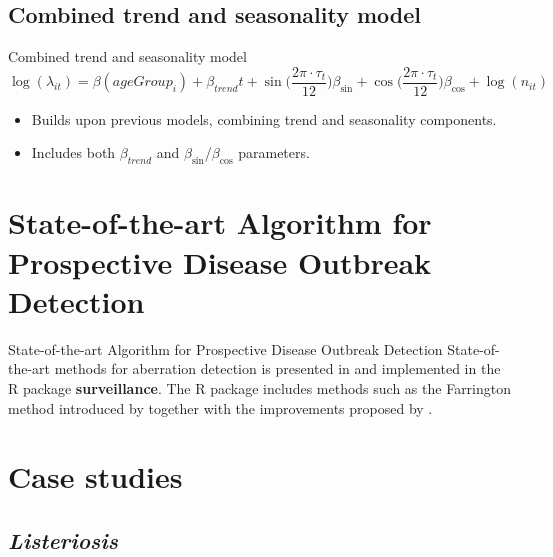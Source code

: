 \documentclass[aspectratio=169]{beamer}
\begin{document}
\hypertarget{combined-trend-and-seasonality-model}{%
\subsection{Combined trend and seasonality
model}\label{combined-trend-and-seasonality-model}}

\begin{frame}{Combined trend and seasonality model}
\begin{equation}\label{eq:AgegroupTrendSeasonality}
  \log(\lambda_{it})=\beta(ageGroup_{i}) + \beta_{trend} t + \sin \big(\frac{2\pi\cdot \tau_t}{12}\big) \beta_{\sin} + \cos \big(\frac{2\pi\cdot \tau_t}{12}\big)\beta_{\cos} + \log(n_{it})
\end{equation}

\begin{itemize}
  \item Builds upon previous models, combining trend and seasonality components.
  \item Includes both $\beta_{trend}$ and $\beta_{\sin}$/$\beta_{\cos}$ parameters.
\end{itemize}
\end{frame}

\hypertarget{state-of-the-art-algorithm-for-prospective-disease-outbreak-detection}{%
\section{State-of-the-art Algorithm for Prospective Disease Outbreak
Detection}\label{state-of-the-art-algorithm-for-prospective-disease-outbreak-detection}}

\begin{frame}{State-of-the-art Algorithm for Prospective Disease
Outbreak Detection}
State-of-the-art methods for aberration detection is presented in
\cite{Salmon_2016} and implemented in the R package
\textbf{surveillance}. The R package includes methods such as the
Farrington method introduced by \cite{Farrington_1996} together with the
improvements proposed by \cite{Noufaily_2013}.
\end{frame}

\hypertarget{case-studies}{%
\section{Case studies}\label{case-studies}}

\hypertarget{listeriosis}{%
\subsection{\texorpdfstring{\emph{Listeriosis}}{Listeriosis}}\label{listeriosis}}
\end{document}
